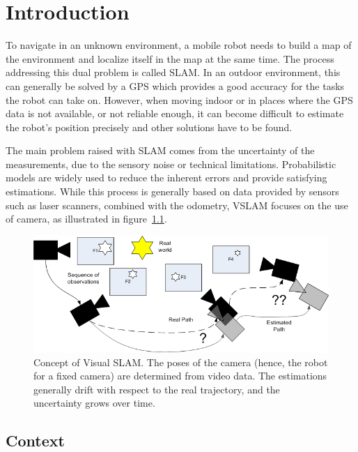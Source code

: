 \chapter{Introduction}

To navigate in an unknown environment, a mobile robot needs to build a map of the environment and localize itself in the map at the same time. The process addressing this dual problem is called \gls{SLAM}. In an outdoor environment, this can generally be solved by a GPS which provides a good accuracy for the tasks the robot can take on. However, when moving indoor or in places where the GPS data is not available, or not reliable enough, it can become difficult to estimate the robot's position precisely and other solutions have to be found. 

The main problem raised with \gls{SLAM} comes from the uncertainty of the measurements, due to the sensory noise or technical limitations. Probabilistic models are widely used to reduce the inherent errors and provide satisfying estimations. While this process is generally based on data provided by sensors such as laser scanners, combined with the odometry, \gls{VSLAM} focuses on the use of camera, as illustrated in figure~\ref{fig:vslam_overview}.

\begin{figure}[H]
\centering
\includegraphics[width=1.0\textwidth]{figures/visual_slam}
\caption{Concept of Visual SLAM. The poses of the camera (hence, the robot for a fixed camera) are determined from video data. The estimations generally drift with respect to the real trajectory, and the uncertainty grows over time.}
\label{fig:vslam_overview}
\end{figure}

\clearpage
\section{Context}

